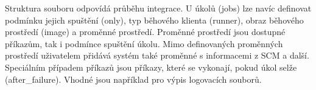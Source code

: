 Struktura souboru odpovídá průběhu integrace.
U úkolů (jobs) lze navíc definovat podmínku jejich spuštění (only), typ běhového klienta (runner), obraz běhového prostředí (image) a proměnné prostředí.
Proměnné prostředí jsou dostupné příkazům, tak i podmínce spuštění úkolu.
Mimo definovaných proměnných prostředí uživatelem přidává systém také proměnné s informacemi z SCM a další.
Speciálním případem příkazů jsou příkazy, které se vykonají, pokud úkol selže (after\_failure).
Vhodné jsou například pro výpis logovacích souborů.


